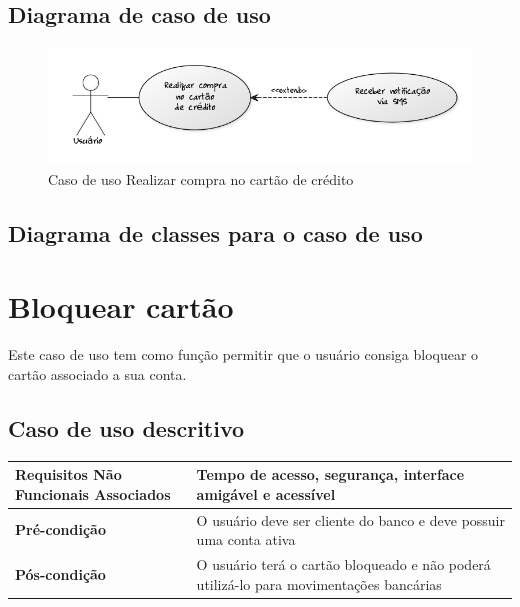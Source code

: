 \subsection{Diagrama de caso de uso}

\begin{figure}[!htb]
     \centering
     \includegraphics[scale=0.6]{diagramas/caso-de-uso/imagens/realizarCompraCartao.png}
     \caption{Caso de uso Realizar compra no cartão de crédito}
\end{figure}

\subsection{Diagrama de classes para o caso de uso}

\section{Bloquear cartão}

Este caso de uso tem como função permitir que o usuário consiga bloquear o cartão associado a sua conta.

\subsection{Caso de uso descritivo}

\begin{table}[h]
  \centering
  \begin{tabular}{|p{4cm} | p{10cm} |}
      \hline
      \small{\textbf{Requisitos Não Funcionais Associados}}	&	Tempo de acesso, segurança, interface amigável e acessível	\\ \hline
      \small{\textbf{Pré-condição}}	&	O usuário deve ser cliente do banco e deve possuir uma conta ativa	\\ \hline
      \small{\textbf{Pós-condição}}	&	O usuário terá o cartão bloqueado e não poderá utilizá-lo para movimentações bancárias	\\ \hline
    \end{tabular}
\end{table}

